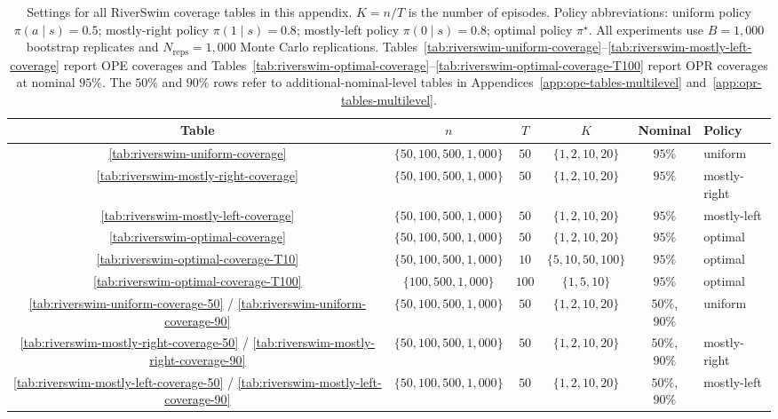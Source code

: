 \documentclass{article}
\numberwithin{equation}{section}
\begin{document}
\begin{table}[ht]
\centering
\caption{Settings for all RiverSwim coverage tables in this appendix.
$K = n/T$ is the number of episodes.
Policy abbreviations: uniform policy $\pi(a\mid s)=0.5$;
mostly-right policy $\pi(1\mid s)=0.8$; mostly-left policy $\pi(0\mid s)=0.8$;
optimal policy $\pi^\star$.
All experiments use $B=1{,}000$ bootstrap replicates and $N_{\mathrm{reps}}=1{,}000$
Monte Carlo replications.
Tables~\ref{tab:riverswim-uniform-coverage}--\ref{tab:riverswim-mostly-left-coverage} report OPE
coverages and Tables~\ref{tab:riverswim-optimal-coverage}--\ref{tab:riverswim-optimal-coverage-T100}
report OPR coverages at nominal $95\%$.
The $50\%$ and $90\%$ rows refer to additional-nominal-level tables in
Appendices~\ref{app:ope-tables-multilevel} and~\ref{app:opr-tables-multilevel}.}
\label{tab:exp-settings}
\vspace{1ex}
\small
\begin{tabular}{|c|c|c|c|c|l|}
\hline
Table & $n$ & $T$ & $K$ & Nominal & Policy \\
\hline
\ref{tab:riverswim-uniform-coverage} & $\{50,100,500,1{,}000\}$ & $50$ & $\{1,2,10,20\}$ & $95\%$ & uniform \\
\hline
\ref{tab:riverswim-mostly-right-coverage} & $\{50,100,500,1{,}000\}$ & $50$ & $\{1,2,10,20\}$ & $95\%$ & mostly-right \\
\hline
\ref{tab:riverswim-mostly-left-coverage} & $\{50,100,500,1{,}000\}$ & $50$ & $\{1,2,10,20\}$ & $95\%$ & mostly-left \\
\hline
\ref{tab:riverswim-optimal-coverage} & $\{50,100,500,1{,}000\}$ & $50$ & $\{1,2,10,20\}$ & $95\%$ & optimal \\
\hline
\ref{tab:riverswim-optimal-coverage-T10} & $\{50,100,500,1{,}000\}$ & $10$ & $\{5,10,50,100\}$ & $95\%$ & optimal \\
\hline
\ref{tab:riverswim-optimal-coverage-T100} & $\{100,500,1{,}000\}$ & $100$ & $\{1,5,10\}$ & $95\%$ & optimal \\
\hline
\ref{tab:riverswim-uniform-coverage-50} / \ref{tab:riverswim-uniform-coverage-90} & $\{50,100,500,1{,}000\}$ & $50$ & $\{1,2,10,20\}$ & $50\%$, $90\%$ & uniform \\
\hline
\ref{tab:riverswim-mostly-right-coverage-50} / \ref{tab:riverswim-mostly-right-coverage-90} & $\{50,100,500,1{,}000\}$ & $50$ & $\{1,2,10,20\}$ & $50\%$, $90\%$ & mostly-right \\
\hline
\ref{tab:riverswim-mostly-left-coverage-50} / \ref{tab:riverswim-mostly-left-coverage-90} & $\{50,100,500,1{,}000\}$ & $50$ & $\{1,2,10,20\}$ & $50\%$, $90\%$ & mostly-left \\

\end{tabular}
\end{table}
\end{document}
